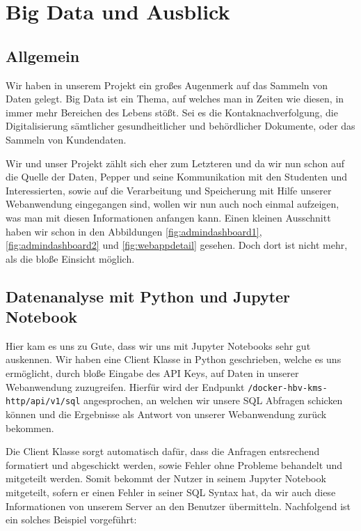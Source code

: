 \newcommand{\bigdatachapter}{Kapitel 9. }
\chapter{Big Data und Ausblick}
\label{chapter:big-data}
\lhead{\bigdatachapter \emph{Big Data und Ausblick}}

\section{Allgemein}
Wir haben in unserem Projekt ein großes Augenmerk auf das Sammeln von Daten gelegt. Big Data ist ein Thema, auf welches man in Zeiten wie diesen, in immer mehr Bereichen des Lebens stößt. Sei es die Kontaknachverfolgung, die Digitalisierung sämtlicher gesundheitlicher und behördlicher Dokumente, oder das Sammeln von Kundendaten.

Wir und unser Projekt zählt sich eher zum Letzteren und da wir nun schon auf die Quelle der Daten, Pepper und seine Kommunikation mit den Studenten und Interessierten, sowie auf die Verarbeitung und Speicherung mit Hilfe unserer Webanwendung eingegangen sind, wollen wir nun auch noch einmal aufzeigen, was man mit diesen Informationen anfangen kann. Einen kleinen Ausschnitt haben wir schon in den Abbildungen \ref{fig:admindashboard1}, \ref{fig:admindashboard2} und \ref{fig:webappdetail} gesehen. Doch dort ist nicht mehr, als die bloße Einsicht möglich.\\

\section{Datenanalyse mit Python und Jupyter Notebook}
Hier kam es uns zu Gute, dass wir uns mit Jupyter Notebooks sehr gut auskennen. Wir haben eine Client Klasse in Python geschrieben, welche es uns ermöglicht, durch bloße Eingabe des API Keys, auf Daten in unserer Webanwendung zuzugreifen. Hierfür wird der Endpunkt \verb|/docker-hbv-kms-http/api/v1/sql| angesprochen, an welchen wir unsere SQL Abfragen schicken können und die Ergebnisse als Antwort von unserer Webanwendung zurück bekommen.

Die Client Klasse sorgt automatisch dafür, dass die Anfragen entsrechend formatiert und abgeschickt werden, sowie Fehler ohne Probleme behandelt und mitgeteilt werden. Somit bekommt der Nutzer in seinem Jupyter Notebook mitgeteilt, sofern er einen Fehler in seiner SQL Syntax hat, da wir auch diese Informationen von unserem Server an den Benutzer übermitteln. Nachfolgend ist ein solches Beispiel vorgeführt:\\

